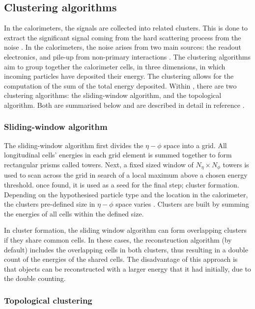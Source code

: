 \subsection{Clustering algorithms}
In the calorimeters, the signals are collected into related clusters. This is done to extract the significant signal coming from the hard scattering process from the noise \cite{Aad_2017_topo_clustering}. In the calorimeters, the noise arises from two main sources: the readout electronics, and pile-up from non-primary interactions \cite{Lampl:1099735}. The clustering algorithms aim to group together the calorimeter cells, in three dimensions, in which incoming particles have deposited their energy. The clustering allows for the computation of the sum of the total energy deposited. Within \ATLAS, there are two clustering algorithms: the sliding-window algorithm, and the topological algorithm. Both are summarised below and are described in detail in reference \cite{Lampl:1099735}. 

\subsubsection{Sliding-window algorithm}

The sliding-window algorithm first divides the $\eta-\phi$ space into a grid. All longitudinal cells' energies in each grid element is summed together to form rectangular prisms called towers. Next, a fixed sized window of $N_{\eta}\times N_{\phi}$ towers is used to scan across the grid in search of a local maximum above a chosen energy threshold. once found, it is used as a seed for the final step; cluster formation. Depending on the hypothesised particle type and the location in the calorimeter, the clusters pre-defined size in $\eta-\phi$ space varies \cite{Lampl:1099735}. Clusters are built by summing the energies of all cells within the defined size.

In cluster formation, the sliding window algorithm can form overlapping clusters if they share common cells. In these cases, the reconstruction algorithm (by default) includes the overlapping cells in both clusters, thus resulting in a double count of the energies of the shared cells. The disadvantage of this approach is that objects can be reconstructed with a larger energy that it had initially, due to the double counting. 

\subsubsection{Topological clustering}


